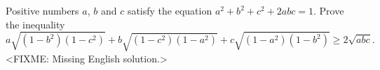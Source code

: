 \problem
Positive numbers $a$, $b$ and $c$ satisfy the equation $a^2+b^2+c^2+2abc=1$.
Prove the inequality
\[
    a \sqrt{(1 - b^2) (1 - c^2)}
    +
    b \sqrt{(1 - c^2) (1 - a^2)}
    +
    c \sqrt{(1 - a^2) (1 - b^2)}
\geq
    2 \sqrt{abc}
.\]
\solution
<FIXME: Missing English solution.>
\endproblem
